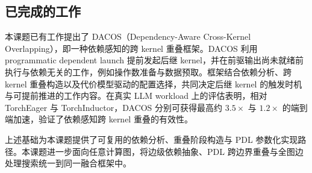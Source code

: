 \subsection{已完成的工作}

本课题已有工作提出了 DACOS（Dependency-Aware Cross-Kernel Overlapping），即一种依赖感知的跨 kernel 重叠框架\cite{hao2026dacos}。DACOS 利用 programmatic dependent launch 提前发起后继 kernel，并在前驱输出尚未就绪前执行与依赖无关的工作，例如操作数准备与数据预取。框架结合依赖分析、跨 kernel 重叠构造以及代价模型驱动的配置选择，共同决定后继 kernel 的触发时机与可提前推进的工作内容。在真实 LLM workload 上的评估表明，相对 TorchEager 与 TorchInductor，DACOS 分别可获得最高约 $3.5\times$ 与 $1.2\times$ 的端到端加速，验证了依赖感知跨 kernel 重叠的有效性。

上述基础为本课题提供了可复用的依赖分析、重叠阶段构造与 PDL 参数化实现路径。本课题进一步面向任意计算图，将边级依赖抽象、PDL 跨边界重叠与全图边处理搜索统一到同一融合框架中。
